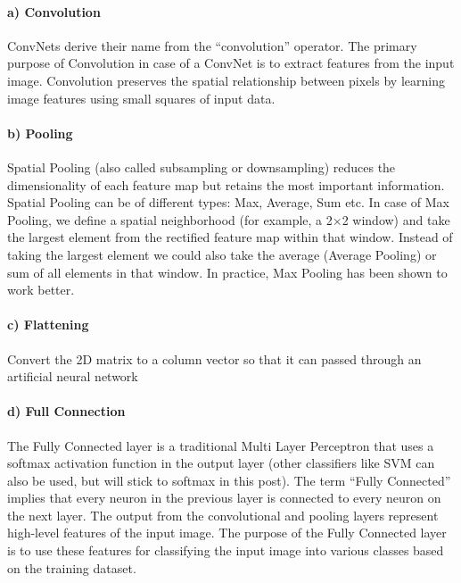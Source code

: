 \documentclass[11pt]{article}
\begin{document}
    \paragraph{a) Convolution}\label{a-convolution}

ConvNets derive their name from the ``convolution'' operator. The
primary purpose of Convolution in case of a ConvNet is to extract
features from the input image. Convolution preserves the spatial
relationship between pixels by learning image features using small
squares of input data.

\paragraph{b) Pooling}\label{b-pooling}

Spatial Pooling (also called subsampling or downsampling) reduces the
dimensionality of each feature map but retains the most important
information. Spatial Pooling can be of different types: Max, Average,
Sum etc. In case of Max Pooling, we define a spatial neighborhood (for
example, a 2×2 window) and take the largest element from the rectified
feature map within that window. Instead of taking the largest element we
could also take the average (Average Pooling) or sum of all elements in
that window. In practice, Max Pooling has been shown to work better.

\paragraph{c) Flattening}\label{c-flattening}

Convert the 2D matrix to a column vector so that it can passed through
an artificial neural network

\paragraph{d) Full Connection}\label{d-full-connection}

The Fully Connected layer is a traditional Multi Layer Perceptron that
uses a softmax activation function in the output layer (other
classifiers like SVM can also be used, but will stick to softmax in this
post). The term ``Fully Connected'' implies that every neuron in the
previous layer is connected to every neuron on the next layer. The
output from the convolutional and pooling layers represent high-level
features of the input image. The purpose of the Fully Connected layer is
to use these features for classifying the input image into various
classes based on the training dataset.
\end{document}
